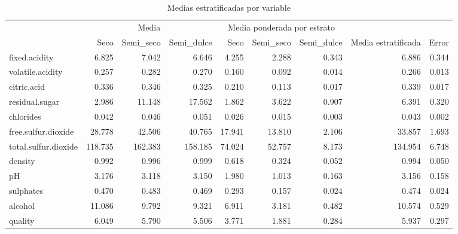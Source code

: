 \documentclass[
]{article}
\begin{document}
\begin{table}[!h]

\caption{\label{tab:gráfica prueba med_ponderada variable}Medias estratificadas por variable}
\centering
\fontsize{8}{10}\selectfont
\begin{tabular}[t]{lrrrrrrrr}
\toprule
\multicolumn{1}{c}{} & \multicolumn{3}{c}{Media} & \multicolumn{3}{c}{Media ponderada por estrato} & \multicolumn{1}{c}{} & \multicolumn{1}{c}{} \\
\cmidrule(l{3pt}r{3pt}){2-4} \cmidrule(l{3pt}r{3pt}){5-7}
  & Seco & Semi\_seco & Semi\_dulce & Seco & Semi\_seco & Semi\_dulce & Media estratificada & Error\\
\midrule
\rowcolor{gray!6}  fixed.acidity & 6.825 & 7.042 & 6.646 & 4.255 & 2.288 & 0.343 & 6.886 & 0.344\\
volatile.acidity & 0.257 & 0.282 & 0.270 & 0.160 & 0.092 & 0.014 & 0.266 & 0.013\\
\rowcolor{gray!6}  citric.acid & 0.336 & 0.346 & 0.325 & 0.210 & 0.113 & 0.017 & 0.339 & 0.017\\
residual.sugar & 2.986 & 11.148 & 17.562 & 1.862 & 3.622 & 0.907 & 6.391 & 0.320\\
\rowcolor{gray!6}  chlorides & 0.042 & 0.046 & 0.051 & 0.026 & 0.015 & 0.003 & 0.043 & 0.002\\
\addlinespace
free.sulfur.dioxide & 28.778 & 42.506 & 40.765 & 17.941 & 13.810 & 2.106 & 33.857 & 1.693\\
\rowcolor{gray!6}  total.sulfur.dioxide & 118.735 & 162.383 & 158.185 & 74.024 & 52.757 & 8.173 & 134.954 & 6.748\\
density & 0.992 & 0.996 & 0.999 & 0.618 & 0.324 & 0.052 & 0.994 & 0.050\\
\rowcolor{gray!6}  pH & 3.176 & 3.118 & 3.150 & 1.980 & 1.013 & 0.163 & 3.156 & 0.158\\
sulphates & 0.470 & 0.483 & 0.469 & 0.293 & 0.157 & 0.024 & 0.474 & 0.024\\
\addlinespace
\rowcolor{gray!6}  alcohol & 11.086 & 9.792 & 9.321 & 6.911 & 3.181 & 0.482 & 10.574 & 0.529\\
quality & 6.049 & 5.790 & 5.506 & 3.771 & 1.881 & 0.284 & 5.937 & 0.297\\
\bottomrule
\end{tabular}
\end{table}
\end{document}
